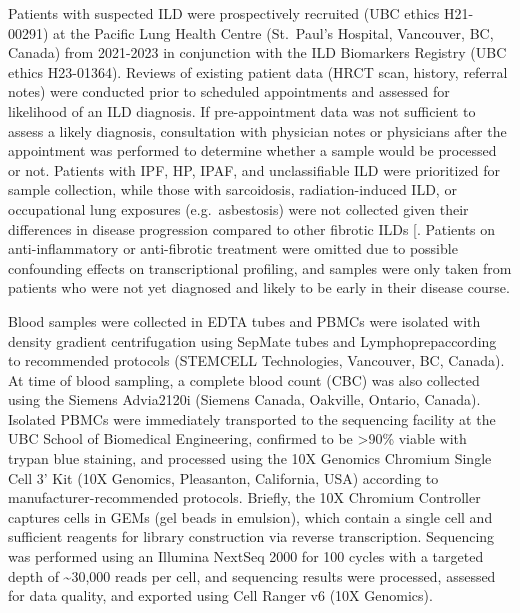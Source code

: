 \documentclass[
]{article}
\begin{document}
Patients with suspected ILD were prospectively recruited (UBC ethics H21-00291) at the Pacific Lung Health Centre (St.~Paul's Hospital, Vancouver, BC, Canada) from 2021-2023 in conjunction with the ILD Biomarkers Registry (UBC ethics H23-01364). Reviews of existing patient data (HRCT scan, history, referral notes) were conducted prior to scheduled appointments and assessed for likelihood of an ILD diagnosis. If pre-appointment data was not sufficient to assess a likely diagnosis, consultation with physician notes or physicians after the appointment was performed to determine whether a sample would be processed or not. Patients with IPF, HP, IPAF, and unclassifiable ILD were prioritized for sample collection, while those with sarcoidosis, radiation-induced ILD, or occupational lung exposures (e.g.~asbestosis) were not collected given their differences in disease progression compared to other fibrotic ILDs {[}\citeproc{ref-cottin_presentation_2018}{157}{]}. Patients on anti-inflammatory or anti-fibrotic treatment were omitted due to possible confounding effects on transcriptional profiling, and samples were only taken from patients who were not yet diagnosed and likely to be early in their disease course.

Blood samples were collected in EDTA tubes and PBMCs were isolated with density gradient centrifugation using SepMate tubes and Lymphoprep\texttrademark according to recommended protocols (STEMCELL Technologies, Vancouver, BC, Canada). At time of blood sampling, a complete blood count (CBC) was also collected using the Siemens Advia\textregistered 2120i (Siemens Canada, Oakville, Ontario, Canada). Isolated PBMCs were immediately transported to the sequencing facility at the UBC School of Biomedical Engineering, confirmed to be \textgreater90\% viable with trypan blue staining, and processed using the 10X Genomics Chromium Single Cell 3' Kit (10X Genomics, Pleasanton, California, USA) according to manufacturer-recommended protocols. Briefly, the 10X Chromium Controller captures cells in GEMs (gel beads in emulsion), which contain a single cell and sufficient reagents for library construction via reverse transcription. Sequencing was performed using an Illumina NextSeq 2000 for 100 cycles with a targeted depth of \textasciitilde30,000 reads per cell, and sequencing results were processed, assessed for data quality, and exported using Cell Ranger v6 (10X Genomics).
\end{document}
